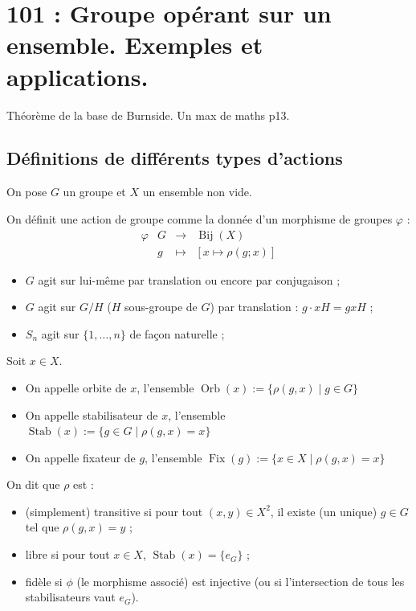 \newpage

\section{101 : Groupe opérant sur un ensemble. Exemples et applications.}


\begin{developpements}
	\item Théorème de la base de Burnside. Un max de maths p13.
\end{developpements}
 
 
\subsection{Définitions de différents types d'actions}

On pose $G$ un groupe et $X$ un ensemble non vide.

\Def
{
On définit une action de groupe comme la donnée d'un morphisme de groupes $\varphi$ : 
\[
	\begin{array}{l|ccc}	
		\varphi & G & \rightarrow & \operatorname{Bij}(X) \\
		& g & \mapsto & {[x \mapsto \rho(g ; x)]}	
	\end{array}
\]
}

\exemple
{
	\begin{itemize}
	    \item $G$ agit sur lui-même par translation ou encore par conjugaison ;
	    \item $G$ agit sur $G/H$ ($H$ sous-groupe de $G$) par translation : $g \cdot xH = gxH$ ;
	    \item $S_n$ agit sur $\{1, \ldots, n\}$ de façon naturelle ;
	\end{itemize}
}



\Def
{
	Soit $x \in X$.
	\begin{itemize}
	    \item On appelle orbite de $x$, l'ensemble $\operatorname{Orb}(x) := \{\rho(g, x) \mid g \in G\}$
	    \item On appelle stabilisateur de $x$, l'ensemble $\operatorname{Stab}(x) := \{g \in G \mid \rho(g, x) = x\}$
	    \item On appelle fixateur de $g$, l'ensemble $ \operatorname{Fix}(g) := \{x \in X \mid \rho(g, x) = x\}$
	\end{itemize}
}

\Def
{
On dit que $\rho$ est :
\begin{itemize}
    \item (simplement) transitive si pour tout $(x, y) \in X^2$, il existe (un unique) $g \in G$ tel que $\rho(g, x) = y$ ;
    \item libre si pour tout $x \in X$, $\operatorname{Stab}(x) = \{e_G\}$ ;
    \item fidèle si $\phi$ (le morphisme associé) est injective (ou si l'intersection de tous les stabilisateurs vaut $e_G$).
\end{itemize}
}

